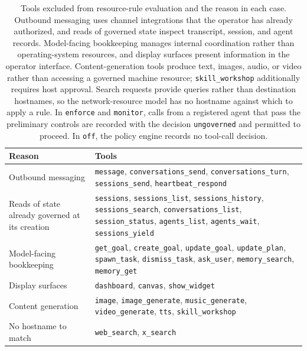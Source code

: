 \begin{table}[h]
\centering
\renewcommand{\arraystretch}{1.35}
\small
\begin{tabular}{@{}>{\raggedright\arraybackslash}p{3.5cm} >{\raggedright\arraybackslash}p{8.3cm}@{}}
\toprule
\textbf{Reason} & \textbf{Tools} \\
\midrule
Outbound messaging &
\texttt{message}, \texttt{conversations\_send}, \texttt{conversations\_turn},
\texttt{sessions\_send}, \texttt{heartbeat\_respond} \\
Reads of state already governed at its creation &
\texttt{sessions}, \texttt{sessions\_list}, \texttt{sessions\_history},
\texttt{sessions\_search}, \texttt{conversations\_list}, \texttt{session\_status},
\texttt{agents\_list}, \texttt{agents\_wait}, \texttt{sessions\_yield} \\
Model-facing bookkeeping &
\texttt{get\_goal}, \texttt{create\_goal}, \texttt{update\_goal},
\texttt{update\_plan}, \texttt{spawn\_task}, \texttt{dismiss\_task},
\texttt{ask\_user}, \texttt{memory\_search}, \texttt{memory\_get} \\
Display surfaces &
\texttt{dashboard}, \texttt{canvas}, \texttt{show\_widget} \\
Content generation &
\texttt{image}, \texttt{image\_generate}, \texttt{music\_generate},
\texttt{video\_generate}, \texttt{tts}, \texttt{skill\_workshop} \\
No hostname to match &
\texttt{web\_search}, \texttt{x\_search} \\
\bottomrule
\end{tabular}
\caption[Tools excluded from resource-rule evaluation]
{\footnotesize Tools excluded from resource-rule evaluation and the reason in
each case. Outbound messaging uses channel integrations that the operator has
already authorized, and reads of governed state inspect transcript, session,
and agent records. Model-facing bookkeeping manages internal coordination
rather than operating-system resources, and display surfaces present
information in the operator interface. Content-generation tools produce text,
images, audio, or video rather than accessing a governed machine resource;
\texttt{skill\_workshop} additionally requires host approval. Search requests
provide queries rather than destination hostnames, so the network-resource
model has no hostname against which to apply a rule. In \texttt{enforce} and
\texttt{monitor}, calls from a registered agent that pass the preliminary
controls are recorded with the decision \texttt{ungoverned} and permitted to
proceed. In \texttt{off}, the policy engine records no tool-call decision.}
\label{tab:gov-ungoverned}
\end{table}


